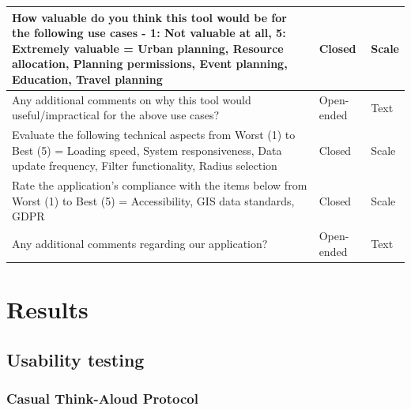 \documentclass{report}
\begin{document}
\begin{table}[h!]
\begin{tabularx}{\textwidth}{|p{}|X|X|}
        How valuable do you think this tool would be for the following use cases - 1: Not valuable at all, 5: Extremely valuable = Urban planning, Resource allocation, Planning permissions, Event planning, Education, Travel planning & Closed                 & Scale                \\ \hline
        Any additional comments on why this tool would useful/impractical for the above use cases?                                                                                                                                       & Open-ended             & Text                 \\ \hline
        Evaluate the following technical aspects from Worst (1) to Best (5) = Loading speed, System responsiveness, Data update frequency, Filter functionality, Radius selection                                                        & Closed                 & Scale                \\ \hline
        Rate the application's compliance with the items below from Worst (1) to Best (5) = Accessibility, GIS data standards, GDPR                                                                                                      & Closed                 & Scale                \\ \hline
        Any additional comments regarding our application?                                                                                                                                                                               & Open-ended             & Text
    \end{tabularx}
\end{table}

\chapter{Results}
\section{Usability testing}
\subsection{Casual Think-Aloud Protocol}
\end{document}
